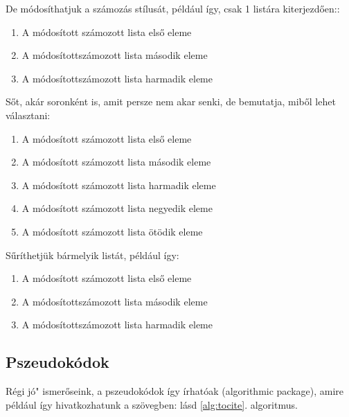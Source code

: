 \documentclass[12pt,a4paper]{article}
\begin{document}
		De módosíthatjuk a számozás stílusát, például így, csak 1 listára kiterjezdően::
		
		\begin{enumerate}
		    \renewcommand{\labelenumi}{\alph{enumi}.)}
		    \item A módosított számozott lista első eleme
		    \item A módosítottszámozott lista második eleme
			\item A módosítottszámozott lista harmadik eleme
		\end{enumerate}
		
		Sőt, akár soronként is, amit persze nem akar senki, de bemutatja, miből lehet választani:
		\begin{enumerate}
		    \renewcommand{\labelenumi}{\arabic{enumi}.} %
		    \item A módosított számozott lista első eleme
		    \renewcommand{\labelenumi}{\alph{enumi}.)}
		    \item A módosított számozott lista második eleme
		    \renewcommand{\labelenumi}{\Alph{enumi}.)}
			\item A módosított számozott lista harmadik eleme
			\renewcommand{\labelenumi}{\roman{enumi}.}
			\item A módosított számozott lista negyedik eleme
			\renewcommand{\labelenumi}{\Roman{enumi}.}
			\item A módosított számozott lista ötödik eleme
		\end{enumerate}
		
		
		Sűríthetjük bármelyik listát, például így:
		
		\begin{enumerate}[noitemsep]
		    \renewcommand{\labelenumi}{\alph{enumi}.)}
		    \item A módosított számozott lista első eleme
		    \item A módosítottszámozott lista második eleme
			\item A módosítottszámozott lista harmadik eleme
		\end{enumerate}
	
	\subsection{Pszeudokódok}
	    Régi \leftq{}jó" ismerőseink, a pszeudokódok így írhatóak (algorithmic package), amire például így hivatkozhatunk a szövegben: lásd \ref{alg:tocite}. algoritmus.
	    
\end{document}
